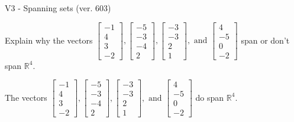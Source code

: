 \begin{exercise}
  \begin{exerciseTitle}V3 - Spanning sets (ver. 603)\end{exerciseTitle}
  \begin{exerciseStatement}
    Explain why the vectors \(\left[\begin{array}{r}
-1 \\
4 \\
3 \\
-2
\end{array}\right] , \left[\begin{array}{r}
-5 \\
-3 \\
-4 \\
2
\end{array}\right] , \left[\begin{array}{r}
-3 \\
-3 \\
2 \\
1
\end{array}\right] , \text{ and } \left[\begin{array}{r}
4 \\
-5 \\
0 \\
-2
\end{array}\right]\) span or don't span \(\mathbb{R}^4\). 
	


  \end{exerciseStatement}
  \begin{exerciseAnswer}
   The vectors \(\left[\begin{array}{r}
-1 \\
4 \\
3 \\
-2
\end{array}\right] , \left[\begin{array}{r}
-5 \\
-3 \\
-4 \\
2
\end{array}\right] , \left[\begin{array}{r}
-3 \\
-3 \\
2 \\
1
\end{array}\right] , \text{ and } \left[\begin{array}{r}
4 \\
-5 \\
0 \\
-2
\end{array}\right]\) 
  	 do  
	span \(\mathbb{R}^4\).
  


  \end{exerciseAnswer}
\end{exercise}